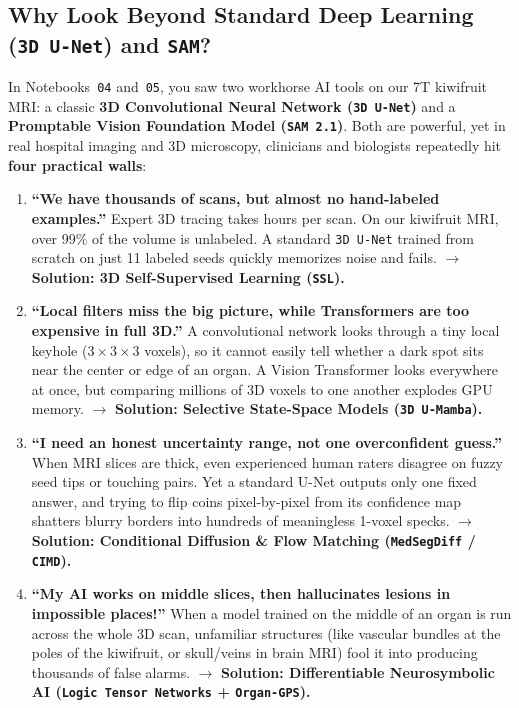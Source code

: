 \documentclass[10.5pt,a4paper]{article}
\begin{document}
\subsection{Why Look Beyond Standard Deep Learning (\texttt{3D U-Net}) and \texttt{SAM}?}

In Notebooks~\texttt{04} and~\texttt{05}, you saw two workhorse AI tools on our 7T kiwifruit MRI: a classic \textbf{3D Convolutional Neural Network (\texttt{3D U-Net})} and a \textbf{Promptable Vision Foundation Model (\texttt{SAM 2.1})}. Both are powerful, yet in real hospital imaging and 3D microscopy, clinicians and biologists repeatedly hit \textbf{four practical walls}:

\begin{enumerate}
    \item \textbf{``We have thousands of scans, but almost no hand-labeled examples.''} Expert 3D tracing takes hours per scan. On our kiwifruit MRI, over 99\% of the volume is unlabeled. A standard \texttt{3D U-Net} trained from scratch on just 11 labeled seeds quickly memorizes noise and fails. $\longrightarrow$ \textbf{Solution: 3D Self-Supervised Learning (\texttt{SSL}).}
    \item \textbf{``Local filters miss the big picture, while Transformers are too expensive in full 3D.''} A convolutional network looks through a tiny local keyhole ($3\times 3\times 3$ voxels), so it cannot easily tell whether a dark spot sits near the center or edge of an organ. A Vision Transformer looks everywhere at once, but comparing millions of 3D voxels to one another explodes GPU memory. $\longrightarrow$ \textbf{Solution: Selective State-Space Models (\texttt{3D U-Mamba}).}
    \item \textbf{``I need an honest uncertainty range, not one overconfident guess.''} When MRI slices are thick, even experienced human raters disagree on fuzzy seed tips or touching pairs. Yet a standard U-Net outputs only one fixed answer, and trying to flip coins pixel-by-pixel from its confidence map shatters blurry borders into hundreds of meaningless 1-voxel specks. $\longrightarrow$ \textbf{Solution: Conditional Diffusion \& Flow Matching (\texttt{MedSegDiff} / \texttt{CIMD}).}
    \item \textbf{``My AI works on middle slices, then hallucinates lesions in impossible places!''} When a model trained on the middle of an organ is run across the whole 3D scan, unfamiliar structures (like vascular bundles at the poles of the kiwifruit, or skull/veins in brain MRI) fool it into producing thousands of false alarms. $\longrightarrow$ \textbf{Solution: Differentiable Neurosymbolic AI (\texttt{Logic Tensor Networks} + \texttt{Organ-GPS}).}
\end{enumerate}
\end{document}
